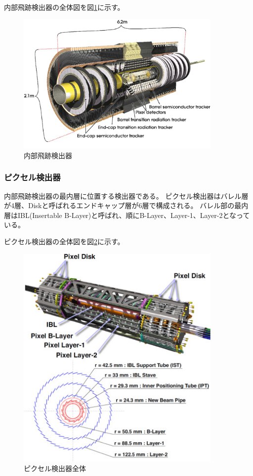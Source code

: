 内部飛跡検出器の全体図を図\ref{inner_detector}に示す。

\begin{figure}[bpt]\centering
\includegraphics[width=10cm]{inner_detector}
\caption[内部飛跡検出器]{内部飛跡検出器\cite{1-2}}
\label{inner_detector}
\end{figure}


%

\clearpage
\subsubsection{ピクセル検出器}

内部飛跡検出器の最内層に位置する検出器である。
ピクセル検出器はバレル層が4層、Diskと呼ばれるエンドキャップ層が6層で構成される。
バレル部の最内層はIBL(Insertable B-Layer)と呼ばれ、順にB-Layer、Layer-1、Layer-2となっている。

ピクセル検出器の全体図を図\ref{pixel_detector_overview}に示す。
\begin{figure}[bpt]\centering
\includegraphics[width=10cm]{pixel_detector_overview}
\caption[ピクセル検出器全体]{ピクセル検出器全体\cite{1-5}}
\label{pixel_detector_overview}
\end{figure}

